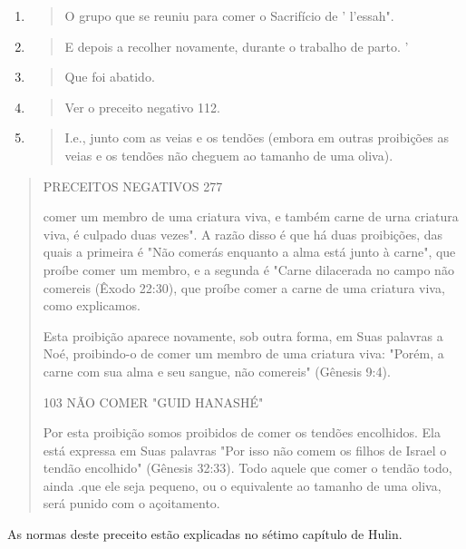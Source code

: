 \begin{enumerate}
\def\labelenumi{\arabic{enumi}.}
\setcounter{enumi}{348}
\item
  \begin{quote}
  O grupo que se reuniu para comer o Sacrifício de ' l'essah".
  \end{quote}
\item
  \begin{quote}
  E depois a recolher novamente, durante o trabalho de parto. '
  \end{quote}
\item
  \begin{quote}
  Que foi abatido.
  \end{quote}
\item
  \begin{quote}
  Ver o preceito negativo 112.
  \end{quote}
\item
  \begin{quote}
  I.e., junto com as veias e os tendões (embora em outras proibições as
  veias e os tendões não cheguem ao tamanho de uma oliva).
  \end{quote}
\end{enumerate}

\begin{quote}
PRECEITOS NEGATIVOS 277

comer um membro de uma criatura viva, e também carne de urna criatura
vi­va, é culpado duas vezes". A razão disso é que há duas proibições,
das quais a primeira é "Não comerás enquanto a alma está junto à carne",
que proíbe comer um membro, e a segunda é "Carne dilacerada no campo não
come­reis (Êxodo 22:30), que proíbe comer a carne de uma criatura viva,
como explicamos.

Esta proibição aparece novamente, sob outra forma, em Suas pala­vras a
Noé, proibindo-o de comer um membro de uma criatura viva: "Porém, a
carne com sua alma e seu sangue, não comereis" (Gênesis 9:4).

103 NÃO COMER "GUID HANASHÉ"

Por esta proibição somos proibidos de comer os tendões encolhi­dos. Ela
está expressa em Suas palavras "Por isso não comem os filhos de Israel o
tendão encolhido" (Gênesis 32:33). Todo aquele que comer o tendão todo,
ainda .que ele seja pequeno, ou o equivalente ao tamanho de uma oliva,
será punido com o açoitamento.
\end{quote}

As normas deste preceito estão explicadas no sétimo capítulo de Hulin.

